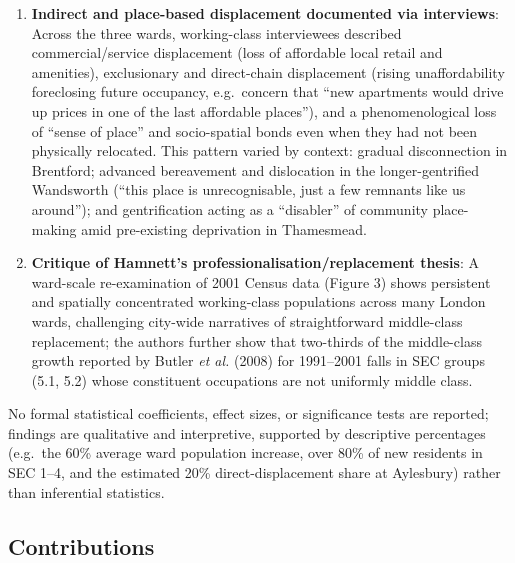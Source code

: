 \begin{enumerate}
  \item \textbf{Indirect and place-based displacement documented via interviews}: Across the three wards, working-class interviewees described commercial/service displacement (loss of affordable local retail and amenities), exclusionary and direct-chain displacement (rising unaffordability foreclosing future occupancy, e.g.\ concern that ``new apartments would drive up prices in one of the last affordable places''), and a phenomenological loss of ``sense of place'' and socio-spatial bonds even when they had not been physically relocated. This pattern varied by context: gradual disconnection in Brentford; advanced bereavement and dislocation in the longer-gentrified Wandsworth (``this place is unrecognisable, just a few remnants like us around''); and gentrification acting as a ``disabler'' of community place-making amid pre-existing deprivation in Thamesmead.
  \item \textbf{Critique of Hamnett's professionalisation/replacement thesis}: A ward-scale re-examination of 2001 Census data (Figure 3) shows persistent and spatially concentrated working-class populations across many London wards, challenging city-wide narratives of straightforward middle-class replacement; the authors further show that two-thirds of the middle-class growth reported by Butler \textit{et al.} (2008) for 1991--2001 falls in SEC groups (5.1, 5.2) whose constituent occupations are not uniformly middle class.
\end{enumerate}

No formal statistical coefficients, effect sizes, or significance tests are reported; findings are qualitative and interpretive, supported by descriptive percentages (e.g.\ the 60\% average ward population increase, over 80\% of new residents in SEC 1--4, and the estimated 20\% direct-displacement share at Aylesbury) rather than inferential statistics.

\subsection*{Contributions}

